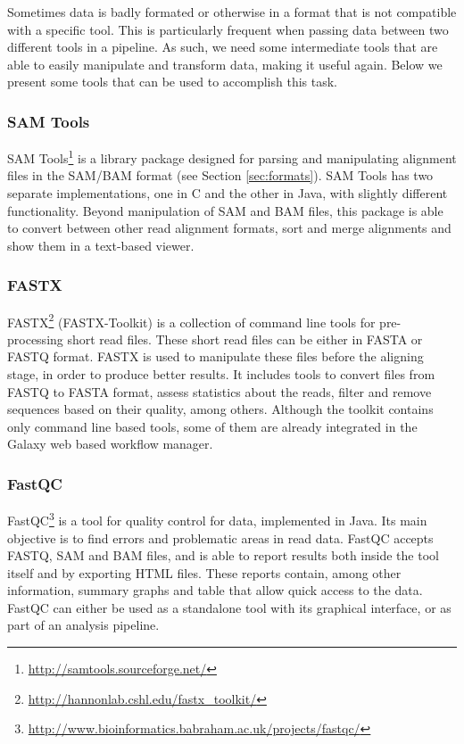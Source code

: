 Sometimes data is badly formated or otherwise in a format that is not compatible
with a specific tool. This is particularly frequent when passing data between
two different tools in a pipeline. As such, we need some intermediate tools that
are able to easily manipulate and transform data, making it useful again. Below
we present some tools that can be used to accomplish this task.

\subsubsection*{SAM Tools}

SAM Tools\footnote{\url{http://samtools.sourceforge.net/}} is a library
package designed for parsing and manipulating alignment files in the SAM/BAM
format \cite{Li2009} (see Section \ref{sec:formats}). SAM Tools has two separate
implementations, one in C and the other in Java, with slightly different
functionality. Beyond manipulation of SAM and BAM files, this package is able to
convert between other read alignment formats, sort and merge alignments and show
them in a text-based viewer.

\subsubsection*{FASTX}

FASTX\footnote{\url{http://hannonlab.cshl.edu/fastx_toolkit/}} (FASTX-Toolkit)
is a collection of command line tools for pre-processing short read files. These
short read files can be either in FASTA or FASTQ format. FASTX is used to
manipulate these files before the aligning stage, in order to produce better
results. It includes tools to convert files from FASTQ to FASTA format, assess
statistics about the reads, filter and remove sequences based on their quality,
among others. Although the toolkit contains only command line based tools, some
of them are already integrated in the Galaxy web based workflow manager.

\subsubsection*{FastQC}

FastQC\footnote{\url{http://www.bioinformatics.babraham.ac.uk/projects/fastqc/}}
is a tool for quality control for \ngs{} data, implemented in Java. Its main
objective is to find errors and problematic areas in \ngs{} read data. FastQC
accepts FASTQ, SAM and BAM files, and is able to report results both inside the
tool itself and by exporting HTML files. These reports contain, among other
information, summary graphs and table that allow quick access to the data.
FastQC can either be used as a standalone tool with its graphical interface, or
as part of an analysis pipeline.

